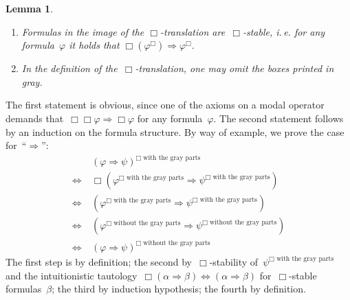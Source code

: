 \documentclass[10pt,reqno,a4paper]{amsbook}
\makeatletter
\theoremstyle{definition}
\theoremstyle{plain}
\newtheorem{lemma}[defn]{Lemma}
\theoremstyle{remark}
\newcommand{\?}{\,{:}\,}
\renewcommand{\_}{\mathpunct{.}\,}
\newcommand{\ie}{i.\,e.\@\xspace}
\renewenvironment{proof}[1][\proofname]{\par
  \pushQED{\qed}%
  \normalfont \topsep6\p@\@plus6\p@\relax
  \trivlist
  \item[\hskip\labelsep
        \itshape
    #1\@addpunct{.}]\ignorespaces
}{%
  \popQED\endtrivlist\@endpefalse
}
\makeatother
\begin{document}
\begin{lemma}\begin{enumerate}
\item Formulas in the image of the $\Box$-translation are~$\Box$-stable,
\ie for any formula~$\varphi$ it holds that
$\Box(\varphi^\Box) \Longrightarrow \varphi^\Box$.
\item In the definition of the~$\Box$-translation, one may omit the boxes
printed in gray.
\end{enumerate}\end{lemma}
\begin{proof}The first statement is obvious, since one of the axioms on a modal
operator demands that~$\Box\Box\varphi \Rightarrow \Box\varphi$ for any
formula~$\varphi$. The second statement follows by an induction on the
formula structure. By way of example, we prove the case for~``$\Rightarrow$'':
\newcommand{\withgray}{\text{$\Box$ with the gray parts}}
\newcommand{\withoutgray}{\text{$\Box$ without the gray parts}}
\begin{align*}
  &\ (\varphi \Rightarrow \psi)^\withgray \\
  \Longleftrightarrow &\ \Box(\varphi^\withgray \Rightarrow \psi^\withgray) \\
  \Longleftrightarrow &\ (\varphi^\withgray \Rightarrow \psi^\withgray) \\
  \Longleftrightarrow &\ (\varphi^\withoutgray \Rightarrow \psi^\withoutgray) \\
  \Longleftrightarrow &\ (\varphi \Rightarrow \psi)^\withoutgray
\end{align*}
The first step is by definition; the second by~$\Box$-stability
of~$\psi^\withgray$ and the intuitionistic tautology~$\Box(\alpha \Rightarrow
\beta) \Leftrightarrow (\alpha \Rightarrow \beta)$ for~$\Box$-stable
formulas~$\beta$; the third by induction hypothesis; the fourth by
definition.
\end{proof}
\end{document}
